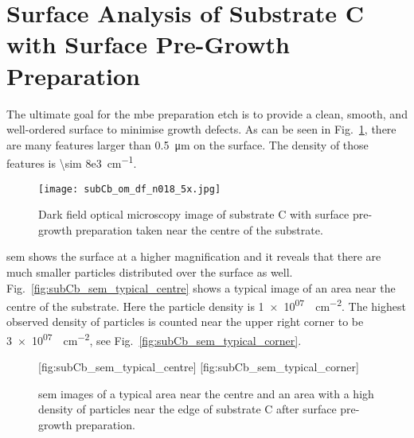 \clearpage
\section[Surface Analysis of Substrate C with Surface Pre-Growth Preparation]{Surface Analysis of Substrate C with Surface Pre-Growth Preparation%
    }\label{sec:subCb}

The ultimate goal for the \ac{mbe} preparation etch is to provide a clean, smooth, and well-ordered surface to minimise growth defects. As can be seen in Fig.~\ref{fig:subCb_om_df}, there are many features larger than \SI{0.5}{\micro\metre} on the surface. The density of those features is \SI{\sim 8e3}{\centi\metre^{-1}}. 

\begin{figure}[htbp]
    \centering
    \texttt{[image: subCb\_om\_df\_n018\_5x.jpg]}
    \caption[Dark field optical microscopy image of substrate C with surface pre-growth preparation.]{Dark field optical microscopy image of substrate C with surface pre-growth preparation taken near the centre of the substrate.}\label{fig:subCb_om_df}
\end{figure}

\Ac{sem} shows the surface at a higher magnification and it reveals that there are much smaller particles distributed over the surface as well. Fig.~\ref{fig:subCb_sem_typical_centre} shows a typical image of an area near the centre of the substrate. Here the particle density is  \SI{1e+07}{\particle\centi\metre^{-2}}. The highest observed density of particles is counted near the upper right corner to be \SI{3e+07}{\particle\centi\metre^{-2}}, see Fig.~\ref{fig:subCb_sem_typical_corner}.

\begin{figure}[htbp]
    [fig:subCb_sem_typical_centre]
    \hfill
    [fig:subCb_sem_typical_corner]
    \caption[\Ac{sem} images of typical areas on substrate C with surface pre-growth preparation.]{\Acf{sem} images of  a typical area near the centre and  an area with a high density of particles near the edge of substrate C after surface pre-growth preparation.}\label{fig:subCb_sem_typical}
\end{figure}

